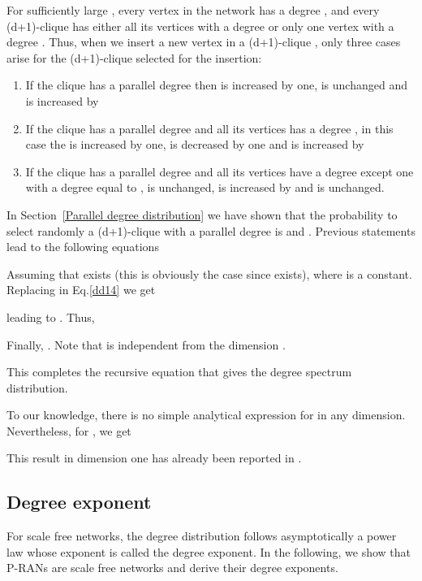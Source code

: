 \documentclass[11pt]{iopart}
\newenvironment{proof}[1][Proof]{\begin{trivlist}
    \item[\hskip \labelsep {\bfseries #1}]}{\end{trivlist}}
\newcommand{\qed}{\nobreak \ifvmode \relax \else
          \ifdim\lastskip<1.5em \hskip-\lastskip
          \hskip1.5em plus0em minus0.5em \fi \nobreak
          \vrule height0.75em width0.5em depth0.25em\fi}
\begin{document}
\begin{proof}
For sufficiently large , every vertex  in the network has a degree , and every (d+1)-clique  has either all its vertices with a degree  or only one vertex with a degree . Thus, when we insert a new vertex in a (d+1)-clique , only three cases arise for the (d+1)-clique selected for the insertion:
\begin{enumerate}
 \item If the clique has a parallel degree  then  is increased by one,  is unchanged and  is increased by 
 \item If the clique has a parallel degree  and all its  vertices has a degree , in this case the  is increased by one,  is decreased by one and  is increased by  
  \item If the clique has a parallel degree  and all its  vertices have a degree  except one with a degree equal to ,  is unchanged,  is increased by  and  is unchanged. 
\end{enumerate}

In Section~\ref{Parallel degree distribution} we have shown that the probability to select randomly a (d+1)-clique with a parallel degree  is  and . Previous statements lead to the following equations





Assuming that  exists (this is obviously the case since  exists),  where  is a constant. Replacing  in Eq.\ref{dd14} we get



leading to . Thus,



Finally, . Note that  is independent from the dimension . 

This completes the recursive equation that gives the degree spectrum distribution.
\qed
\end{proof}

To our knowledge, there is no simple analytical expression for  in any dimension. Nevertheless, for , we get 



This result in dimension one has already been reported in \cite{Dorogovtsev:cond-mat0011115}.



\subsection{Degree exponent}
For scale free networks, the degree distribution follows asymptotically a power law whose exponent is called the degree exponent. In the following, we show that P-RANs are scale free networks and derive their degree exponents.
\end{document}
